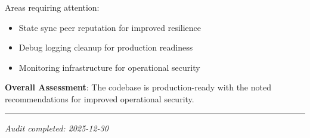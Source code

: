 \documentclass[
]{article}
\providecommand{\tightlist}{%
  \setlength{\itemsep}{0pt}\setlength{\parskip}{0pt}}
\begin{document}
Areas requiring attention:

\begin{itemize}
\tightlist
\item
  State sync peer reputation for improved resilience
\item
  Debug logging cleanup for production readiness
\item
  Monitoring infrastructure for operational security
\end{itemize}

\textbf{Overall Assessment}: The codebase is production-ready with the
noted recommendations for improved operational security.

\begin{center}\rule{0.5\linewidth}{0.5pt}\end{center}

\emph{Audit completed: 2025-12-30}
\end{document}
